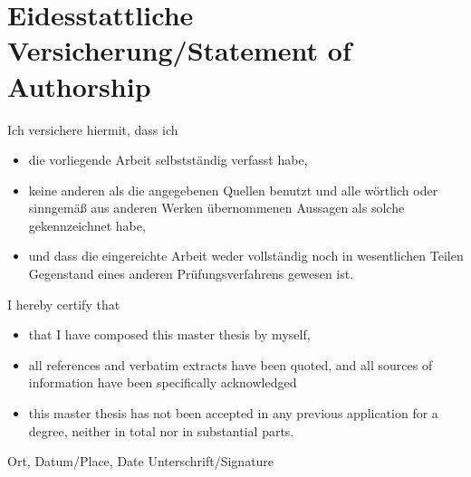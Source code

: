 \documentclass[a4paper,12pt]{scrartcl}
\begin{document}
\section{Eidesstattliche Versicherung/Statement of Authorship}

Ich versichere hiermit, dass ich
\begin{itemize}
    \item die vorliegende Arbeit selbstständig verfasst habe,
    \item keine anderen als die angegebenen Quellen benutzt und alle wörtlich oder
    sinngemäß aus anderen Werken übernommenen Aussagen als solche gekennzeichnet
    habe,
    \item und dass die eingereichte Arbeit weder vollständig noch in wesentlichen Teilen Gegenstand
    eines anderen Prüfungsverfahrens gewesen ist.
\end{itemize}

\vspace{2.5cm}

I hereby certify that
\begin{itemize}
    \item that I have composed this master thesis by myself,
    \item all references and verbatim extracts have been quoted, and all sources of information have been specifically acknowledged
    \item this master thesis has not been accepted in any previous application for a degree, neither in total nor in substantial parts.
\end{itemize}

\vspace{3cm}
\makebox[\textwidth]{\hrulefill \hspace{3cm} \hrulefill}

Ort, Datum/Place, Date \hfill Unterschrift/Signature
\end{document}
